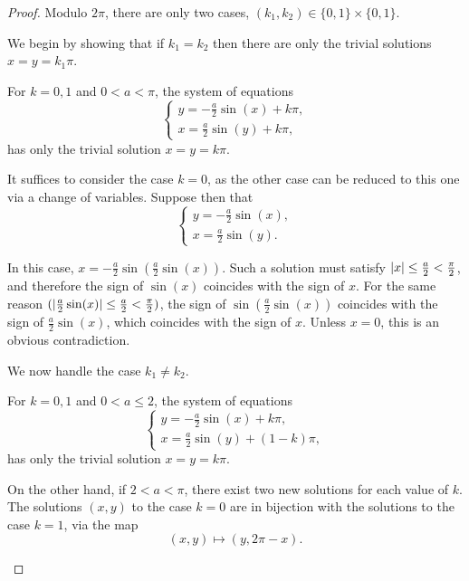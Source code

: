 \begin{proof}
Modulo $2\pi$, there are only two cases, $(k_1, k_2) \in \{0,1\} \times \{0,1\}$.

We begin by showing that if $k_1 = k_2$ then there are only the trivial solutions $x = y = k_1 \pi$.

\begin{lemma}
For $k = 0, 1$ and $0 < a < \pi$, the system of equations
\begin{equation}
\begin{cases}
y = - \frac a 2 \sin(x) + k \pi,\\
x = \frac a 2 \sin(y) + k \pi,
\end{cases}
\end{equation}
has only the trivial solution $x = y = k \pi$.
\end{lemma}

\begin{lemmaproof}
It suffices to consider the case $k = 0$, as the other case can be reduced to this one via a change of variables. Suppose then that
\begin{equation}
\begin{cases}
y = - \frac a 2 \sin(x),\\
x = \frac a 2 \sin(y).
\end{cases}
\end{equation}

In this case, $x = - \frac a 2 \sin\left(\frac a 2 \sin(x)\right)$. Such a solution must satisfy $\lvert x\rvert \leq \frac a 2 < \frac \pi 2$, and therefore the sign of $\sin(x)$ coincides with the sign of $x$. For the same reason $(\lvert\frac a 2 \sin(x)\rvert \leq \frac a 2 < \frac \pi 2)$, the sign of $\sin\left(\frac a 2 \sin(x) \right)$ coincides with the sign of $\frac a2 \sin(x)$, which coincides with the sign of $x$. Unless $x=0$, this is an obvious contradiction.
\end{lemmaproof}

We now handle the case $k_1 \neq k_2$.

\begin{lemma}
For $k = 0, 1$ and $0 < a \leq 2$, the system of equations
\begin{equation}\label{phi2id3}
\begin{cases}
y = - \frac a 2 \sin(x) + k \pi,\\
x = \frac a 2 \sin(y) + (1-k) \pi,
\end{cases}
\end{equation}
has only the trivial solution $x = y = k \pi$.

On the other hand, if $2 < a < \pi$, there exist two new solutions for each value of $k$. The solutions $(x,y)$ to the case $k=0$ are in bijection with the solutions to the case $k=1$, via the map
\begin{equation}
(x,y) \mapsto (y, 2\pi - x).
\end{equation}


\end{lemma}
\end{proof}

